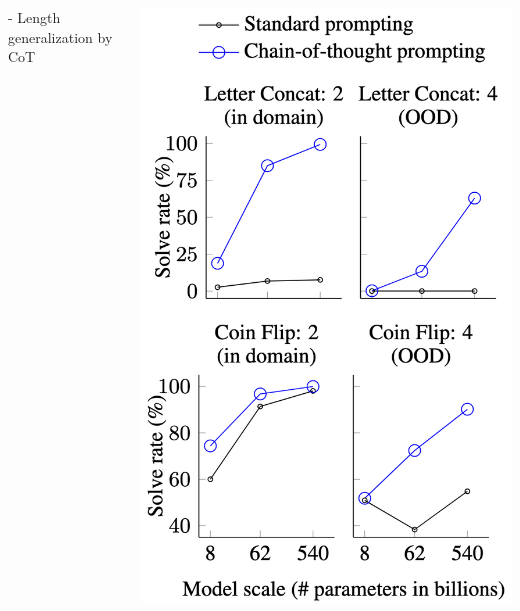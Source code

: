 \documentclass[professionalfont]{beamer}
\begin{document}
\begin{frame}
\begin{columns}
{\begin{itemize}
        - Length generalization by CoT
    \end{itemize}
    }
    \includegraphics[width=0.9\linewidth]{figure8.png}
\end{columns}

\end{frame}
\end{document}
